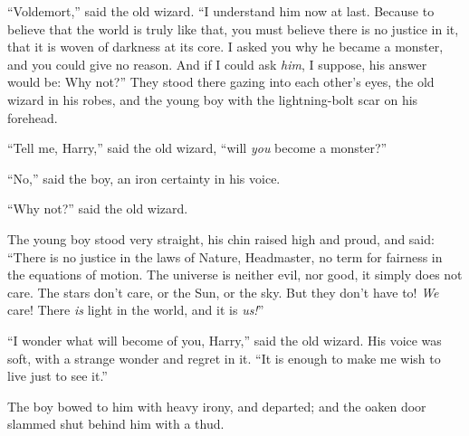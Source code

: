 “Voldemort,” said the old wizard. “I understand him now at last. Because to believe that the world is truly like that, you must believe there is no justice in it, that it is woven of darkness at its core. I asked you why he became a monster, and you could give no reason. And if I could ask \emph{him}, I suppose, his answer would be: Why not?”
\sbreak
They stood there gazing into each other’s eyes, the old wizard in his robes, and the young boy with the lightning-bolt scar on his forehead.

“Tell me, Harry,” said the old wizard, “will \emph{you} become a monster?”

“No,” said the boy, an iron certainty in his voice.

“Why not?” said the old wizard.

The young boy stood very straight, his chin raised high and proud, and said: “There is no justice in the laws of Nature, Headmaster, no term for fairness in the equations of motion. The universe is neither evil, nor good, it simply does not care. The stars don’t care, or the Sun, or the sky. But they don’t have to! \emph{We} care! There \emph{is} light in the world, and it is \emph{us!}”

“I wonder what will become of you, Harry,” said the old wizard. His voice was soft, with a strange wonder and regret in it. “It is enough to make me wish to live just to see it.”

The boy bowed to him with heavy irony, and departed; and the oaken door slammed shut behind him with a thud.

